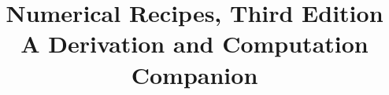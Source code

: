 
\title{Numerical Recipes, Third Edition\\A Derivation and Computation Companion}

\maketitle
\begin{notesbody}
\tableofcontents









\end{notesbody}

